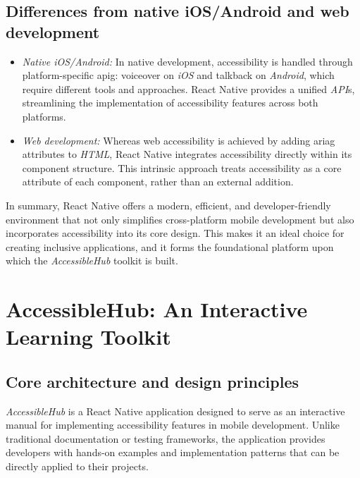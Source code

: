 \subsection{Differences from native iOS/Android and web development}
\begin{itemize}
    \item \textit{Native iOS/Android:}  
    In native development, accessibility is handled through platform-specific \gls{apig}: \gls{voiceover} on \textit{iOS} and \gls{talkback} on \textit{Android}, which require different tools and approaches. React Native provides a unified \textit{API}s, streamlining the implementation of accessibility features across both platforms.
    
    \item \textit{Web development:}  
    Whereas web accessibility is achieved by adding \gls{ariag} attributes to \textit{HTML}, React Native integrates accessibility directly within its component structure. This intrinsic approach treats accessibility as a core attribute of each component, rather than an external addition.
\end{itemize}

In summary, React Native offers a modern, efficient, and developer-friendly environment that not only simplifies cross-platform mobile development but also incorporates accessibility into its core design. This makes it an ideal choice for creating inclusive applications, and it forms the foundational platform upon which the \textit{AccessibleHub} toolkit is built.

\section{AccessibleHub: An Interactive Learning Toolkit}
\label{sec:accessiblehub}

\subsection{Core architecture and design principles}

\textit{AccessibleHub} is a React Native application designed to serve as an interactive manual for implementing accessibility features in mobile development. Unlike traditional documentation or testing frameworks, the application provides developers with hands-on examples and implementation patterns that can be directly applied to their projects.

